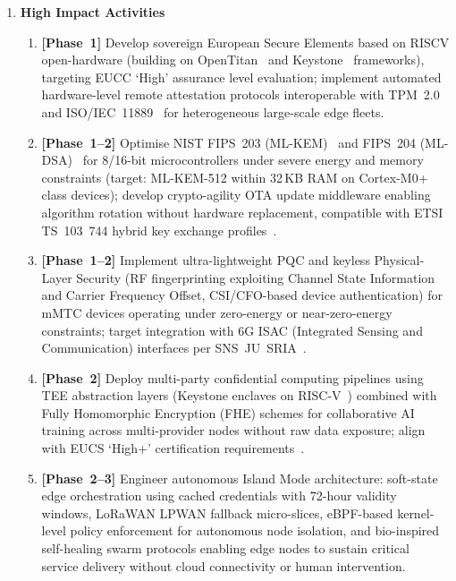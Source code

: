 \begin{enumerate}
\item \textbf{High Impact Activities}

\begin{enumerate}[label=(\alph*)]
  \item \textbf{[Phase~1]} Develop sovereign European Secure Elements based on
        RISC\-V open-hardware (building on OpenTitan~\cite{opentitan} and
        Keystone~\cite{keystone} frameworks), targeting EUCC `High' assurance level
        evaluation; implement automated hardware-level remote attestation protocols
        interoperable with TPM~2.0~\cite{tgcpm20} and ISO/IEC~11889~\cite{isoiec11889}
        for heterogeneous large-scale edge fleets.

  \item \textbf{[Phase~1--2]} Optimise NIST FIPS~203 (ML-KEM)~\cite{fips203} and
        FIPS~204 (ML-DSA)~\cite{fips204} for 8/16-bit microcontrollers under severe
        energy and memory constraints (target: ML-KEM-512 within 32\,KB RAM on
        Cortex-M0+ class devices); develop crypto-agility OTA update middleware enabling
        algorithm rotation without hardware replacement, compatible with ETSI TS~103~744
        hybrid key exchange profiles~\cite{etsi103744}.

  \item \textbf{[Phase~1--2]} Implement ultra-lightweight PQC and keyless
        Physical-Layer Security (RF fingerprinting exploiting Channel State Information
        and Carrier Frequency Offset, CSI/CFO-based device authentication) for mMTC
        devices operating under zero-energy or near-zero-energy constraints; target
        integration with 6G ISAC (Integrated Sensing and Communication) interfaces per
        SNS~JU~SRIA~\cite{snsju}.

  \item \textbf{[Phase~2]} Deploy multi-party confidential computing pipelines
        using TEE abstraction layers (Keystone enclaves on RISC-V~\cite{keystone})
        combined with Fully Homomorphic Encryption (FHE) schemes for collaborative AI
        training across multi-provider nodes without raw data exposure; align with
        EUCS `High+' certification requirements~\cite{eucs}.

  \item \textbf{[Phase~2--3]} Engineer autonomous Island Mode architecture: soft-state
        edge orchestration using cached credentials with 72-hour validity windows,
        LoRaWAN LPWAN fallback micro-slices, eBPF-based kernel-level policy enforcement
        for autonomous node isolation, and bio-inspired self-healing swarm protocols
        enabling edge nodes to sustain critical service delivery without cloud
        connectivity or human intervention.
\end{enumerate}


\end{enumerate}
